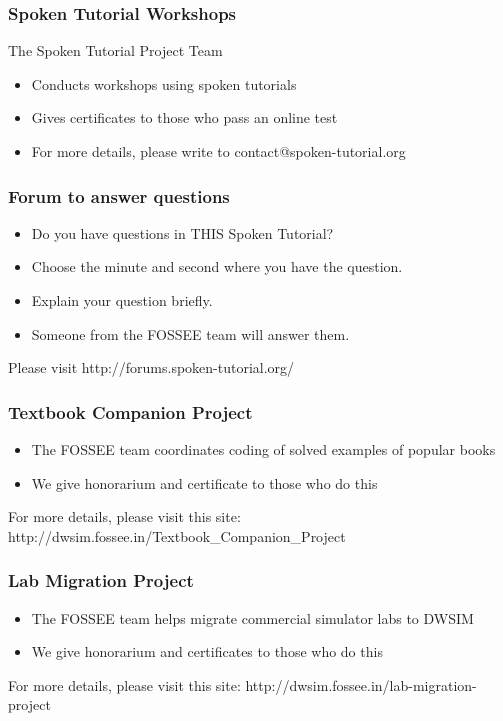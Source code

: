 \documentclass[17pt,xcolor=table]{beamer}
\begin{document}
\begin{frame}
\frametitle{Spoken Tutorial Workshops}
The Spoken Tutorial Project Team
\begin{itemize}
\item Conducts workshops using spoken tutorials
\item Gives certificates to those who pass an online test
\item For more details, please write to {\color{blue} contact@spoken-tutorial.org}
\end{itemize}
\end{frame}

\begin{frame}
\frametitle{Forum to answer questions}
\vspace{-0.5in}
\begin{itemize}
\item Do you have questions in THIS Spoken Tutorial?
\item Choose the minute and second where you have the question.
\item Explain your question briefly.
\item Someone from the FOSSEE team will answer them.
\end{itemize}
Please visit {\small \color{blue}
  http://forums.spoken-tutorial.org/} 
\end{frame}

\begin{frame}
\frametitle{Textbook Companion Project}
\begin{itemize}
\item The FOSSEE team coordinates coding of solved examples of popular
  books 
\item We give honorarium and certificate to those who do this
\end{itemize}
For more details, please visit this site: 
{\small \color{blue} http://dwsim.fossee.in/Textbook\_Companion\_Project}
\end{frame}

\begin{frame}
\frametitle{Lab Migration Project}
\begin{itemize}
\item The FOSSEE team helps migrate commercial simulator labs to DWSIM
\item We give honorarium and certificates to those who do this
\end{itemize}
For more details, please visit this site: 
{\color{blue} http://dwsim.fossee.in/lab-migration-project}
\end{frame}
\end{document}
